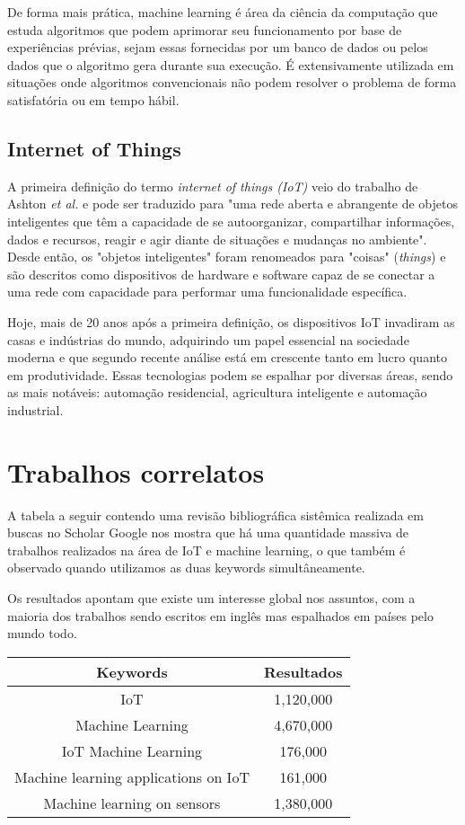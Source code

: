 \documentclass[12pt]{article}
\begin{document}
De forma mais prática, machine learning é área da ciência da computação que estuda algoritmos que podem aprimorar seu funcionamento por base de experiências prévias, sejam essas fornecidas por um banco de dados ou pelos dados que o algoritmo gera durante sua execução. É extensivamente utilizada em situações onde algoritmos convencionais não podem resolver o problema de forma satisfatória ou em tempo hábil.

\subsection{Internet of Things}

A primeira definição do termo \emph{internet of things (IoT)} veio do trabalho de Ashton \emph{et al.} e pode ser traduzido para "uma rede aberta e abrangente de objetos inteligentes que têm a capacidade de se autoorganizar, compartilhar informações, dados e recursos, reagir e agir diante de situações e mudanças no ambiente". Desde então, os "objetos inteligentes" foram renomeados para "coisas" (\emph{things}) e são descritos como dispositivos de hardware e software capaz de se conectar a uma rede com capacidade para performar uma funcionalidade específica. 

Hoje, mais de 20 anos após a primeira definição, os dispositivos IoT invadiram as casas e indústrias do mundo, adquirindo um papel essencial na sociedade moderna e que segundo recente análise \cite{analisis} está em crescente tanto em lucro quanto em produtividade. Essas tecnologias podem se espalhar por diversas áreas, sendo as mais notáveis: automação residencial, agricultura inteligente e automação industrial.

\section{Trabalhos correlatos}

A tabela a seguir contendo uma revisão bibliográfica sistêmica realizada em buscas no Scholar Google nos mostra que há uma quantidade massiva de trabalhos realizados na área de IoT e machine learning, o que também é observado quando utilizamos as duas keywords simultâneamente.

Os resultados apontam que existe um interesse global nos assuntos, com a maioria dos trabalhos sendo escritos em inglês mas espalhados em países pelo mundo todo.

\begin{center}
    \begin{tabular}{ | c | c | }
    \hline
    Keywords & Resultados \\ 
    \hline
    IoT & 1,120,000 \\  
    \hline
    Machine Learning & 4,670,000 \\
    \hline
    IoT Machine Learning & 176,000 \\
    \hline
    Machine learning applications on IoT & 161,000 \\
    \hline
    Machine learning on sensors & 1,380,000 \\
    \hline
    \end{tabular}
\end{center}
\end{document}
